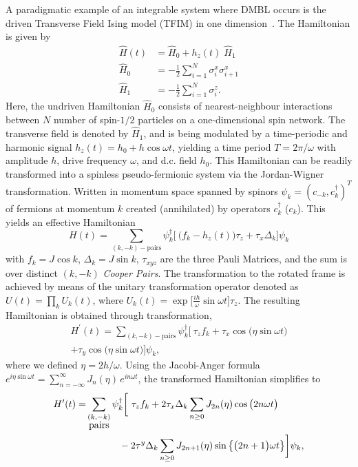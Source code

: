 \documentclass[%
reprint,
superscriptaddress,
amsmath,amssymb,
aps,
prb,
]{revtex4-2}
\begin{document}
	A paradigmatic example of an integrable system where DMBL occurs is  the driven Transverse Field Ising model (TFIM) in one dimension~\cite{stinchcombe_ising_1973}. The Hamiltonian is given by
	\begin{align}
		\label{eq:tfim:hamilt}
		\hat{H}(t) &= \hat{H}_0 + h_z(t) \; \hat{H}_1\\
		\hat{H}_0 &= -\frac{1}{2}\sum^N_{i=1} \sigma^x_i \sigma^x_{i+1}\\
		\hat{H}_1 &= -\frac{1}{2}\sum_{i=1}^N \sigma^z_{i}.
	\end{align}
Here, the undriven Hamiltonian $\hat{H}_0$ consists of nearest-neighbour interactions between $N$ number of  spin-$1/2$ particles on a one-dimensional spin network. The transverse field is denoted by $\hat{H}_1$, and is being modulated by a time-periodic and harmonic signal $h_z(t) = h_0 + h\cos{\omega t}$, yielding a time period $T=2\pi/\omega$ with amplitude $h$, drive frequency $\omega$, and d.c. field $h_0$. This Hamiltonian can be readily transformed into a spinless pseudo-fermionic system via the Jordan-Wigner transformation. Written in momentum space spanned by spinors $\psi_k = (c_{-k}, c^\dagger_k)^T$ of fermions at momentum $k$ created (annihilated) by operators $c^\dagger_k$ ($c_k$). This yields an effective Hamiltonian ~\cite{mbeng_quantum_2020}
	\begin{equation}
		H(t) = \sum_{(k,-k)-\mbox{pairs}} \psi^\dagger_k
		\Bigg[\ \bigg(f_k - h_z(t)\bigg)\tau_z +  \tau_x \Delta_k\Bigg]\psi_k
	\end{equation}
	with $f_k = J\cos{k}$, $\Delta_k = J\sin{k}$, $\tau_{xyz}$ are the three Pauli Matrices, and the sum is over distinct $(k, -k)$ \textit{Cooper Pairs}. The transformation to the rotated frame is achieved by means of the unitary transformation operator denoted as $U(t) = \prod_k U_k(t)$, where $U_k(t) = \exp{\Big[\frac{i h}{\omega}\sin{\omega t}\Big]\tau_z}$. The resulting Hamiltonian is obtained through transformation,
	\begin{multline*}
		H^\prime(t) = \sum_{(k,-k)-\mbox{pairs}} \psi^\dagger_k
		\bigg[\ \tau_z f_k + \tau_x \cos{\big(\eta\sin{\omega t}\big)}  \\
		+ \tau_y \cos{\big(\eta\sin{\omega t}\big)}\bigg]\psi_k,
	\end{multline*}
	where we defined $\eta=2h/\omega$. Using the Jacobi-Anger formula $e^{i \eta \sin{\omega t}} = \sum_{n=-\infty}^{\infty} J_n(\eta)\, e^{i n \omega t}$, the transformed Hamiltonian simplifies to \\
	\begin{align}
		H^\prime(t) =& \sum_{\substack{(k,-k) \\ \mbox{pairs}}} \psi^\dagger_k
		\bigg[\ \tau_z f_k + 2\tau_x \Delta_k \sum_{n\geq 0} J_{2n}(\eta)\cos{\big(2n\omega t\big)} \nonumber\\
		&\hskip 1.2cm- 2\tau^y\Delta_k \sum_{n\geq 0} J_{2n+1}(\eta)\sin{\big\{\big(2n+1\big)\omega t\big\}}   \bigg]\psi_k,
	\end{align}\\
	
\end{document}
